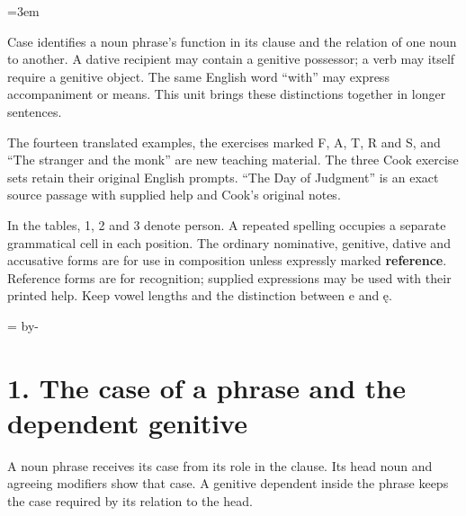 \newcommand{\runningtitle}{Unit 10. The case system}

\emergencystretch=3em
\newcommand{\itempara}[2]{\par\addvspace{3pt}\noindent\hangindent=1.8em\hangafter=1\makebox[1.8em][l]{#1.}#2\par}
\newcommand{\reserve}[1]{\par\penalty-100\begingroup\dimen0=\pagegoal\advance\dimen0 by-\pagetotal\ifdim\dimen0<#1\newpage\fi\endgroup}

\raggedright
{}

Case identifies a noun phrase's function in its clause and the relation of one noun to another. A dative recipient may contain a genitive possessor; a verb may itself require a genitive object. The same English word “with” may express accompaniment or means. This unit brings these distinctions together in longer sentences.

The fourteen translated examples, the exercises marked F, A, T, R and S, and “The stranger and the monk” are new teaching material. The three Cook exercise sets retain their original English prompts. “The Day of Judgment” is an exact source passage with supplied help and Cook's original notes.

In the tables, 1, 2 and 3 denote person. A repeated spelling occupies a separate grammatical cell in each position. The ordinary nominative, genitive, dative and accusative forms are for use in composition unless expressly marked \textbf{reference}. Reference forms are for recognition; supplied expressions may be used with their printed help. Keep vowel lengths and the distinction between e and ę.

\reserve{7\baselineskip}
\section*{1. The case of a phrase and the dependent genitive}

A noun phrase receives its case from its role in the clause. Its head noun and agreeing modifiers show that case. A genitive dependent inside the phrase keeps the case required by its relation to the head.

